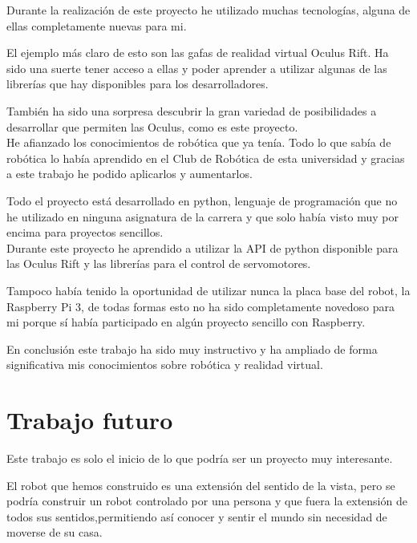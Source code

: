 \documentclass[twoside, 11pt]{epstfg}
\begin{document}
Durante la realización de este proyecto he utilizado muchas tecnologías, alguna de ellas completamente nuevas para mi.

El ejemplo más claro de esto son las gafas de realidad virtual Oculus Rift. Ha sido una suerte tener acceso a ellas y poder aprender a utilizar algunas de las librerías que hay disponibles para los desarrolladores.

También ha sido una sorpresa descubrir la gran variedad de posibilidades a desarrollar que permiten las Oculus, como es este proyecto.\\
He afianzado los conocimientos de robótica que ya tenía. Todo lo que sabía de robótica lo había aprendido en el Club de Robótica de esta universidad y gracias a este trabajo he podido aplicarlos y aumentarlos.

Todo el proyecto está desarrollado en python, lenguaje de programación que no he utilizado en ninguna asignatura de la carrera y que solo había visto muy por encima para proyectos sencillos.\\
Durante este proyecto he aprendido a utilizar la API de python disponible para las Oculus Rift y las librerías para el control de servomotores.

Tampoco había tenido la oportunidad de utilizar nunca la placa base del robot, la Raspberry Pi 3, de todas formas esto no ha sido completamente novedoso para mi porque sí había participado en algún proyecto sencillo con Raspberry.

En conclusión este trabajo ha sido muy instructivo y ha ampliado de forma significativa mis conocimientos sobre robótica y realidad virtual.



\section{Trabajo futuro}
Este trabajo es solo el inicio de lo que podría ser un proyecto muy interesante.

El robot que hemos construido es una extensión del sentido de la vista, pero se podría construir un robot controlado por una persona y que fuera la extensión de todos sus sentidos,permitiendo así conocer y sentir el mundo sin necesidad de moverse de su casa.
\end{document}
